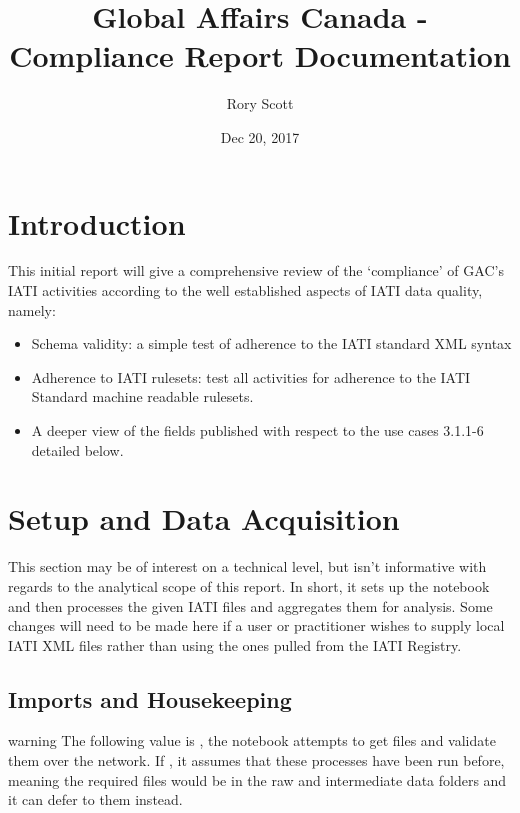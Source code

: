\documentclass[letterpaper,10pt,english]{sphinxmanual}
\title{Global Affairs Canada - Compliance Report Documentation}
\date{Dec 20, 2017}
\author{Rory Scott}
\newenvironment{notice}{\begin{sphinxadmonition}}{\end{sphinxadmonition}}%
\begin{document}
\maketitle
\sphinxtableofcontents
{}\label{\detokenize{index::doc}}



\chapter{Introduction}
\label{\detokenize{Global Affairs Canada - Compliance Report:Introduction}}\label{\detokenize{Global Affairs Canada - Compliance Report:welcome-to-the-compliance-report-for-global-affairs-canada}}\label{\detokenize{Global Affairs Canada - Compliance Report::doc}}
This initial report will give a comprehensive review of the ‘compliance’
of GAC’s IATI activities according to the well established aspects of
IATI data quality, namely:
\begin{itemize}
\item {} 
Schema validity: a simple test of adherence to the IATI standard XML
syntax

\item {} 
Adherence to IATI rulesets: test all activities for adherence to the
IATI Standard machine readable rulesets.

\item {} 
A deeper view of the fields published with respect to the use cases
3.1.1-6 detailed below.

\end{itemize}


\chapter{Setup and Data Acquisition}
\label{\detokenize{Global Affairs Canada - Compliance Report:Setup-and-Data-Acquisition}}
This section may be of interest on a technical level, but isn't
informative with regards to the analytical scope of this report. In
short, it sets up the notebook and then processes the given IATI files
and aggregates them for analysis. Some changes will need to be made here
if a user or practitioner wishes to supply local IATI XML files rather
than using the ones pulled from the IATI Registry.


\section{Imports and Housekeeping}
\label{\detokenize{Global Affairs Canada - Compliance Report:Imports-and-Housekeeping}}
\begin{notice}{warning}{}\unskip
The following value is , the notebook attempts to get files
and validate them over the network. If , it assumes that
these processes have been run before, meaning the required files would
be in the raw and intermediate data folders and it can defer to them
instead.
\end{notice}
\end{document}
